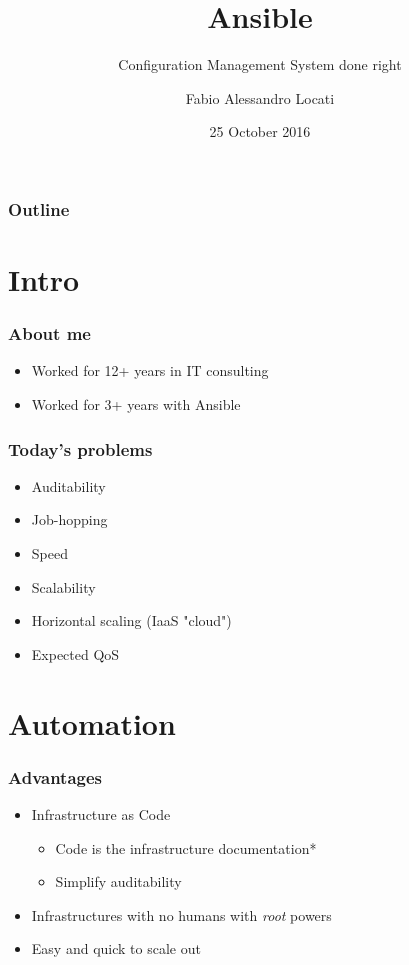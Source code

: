 \documentclass[t,aspectratio=169]{beamer}
\title{Ansible}
\subtitle{Configuration Management System done right}
\author{Fabio Alessandro Locati}
\date{25 October 2016}
\begin{document}
\maketitle

\begin{frame}
    \frametitle{Outline}
    \tableofcontents
\end{frame}

\section{Intro}
\begin{frame}
    \frametitle{About me}
    \begin{itemize}
        \item<2-> Worked for 12+ years in IT consulting
        \item<3-> Worked for 3+ years with Ansible 
    \end{itemize}
\end{frame}

\begin{frame}
    \frametitle{Today's problems}
    \begin{itemize}
        \item<2-> Auditability
        \item<3-> Job-hopping
        \item<4-> Speed
        \item<5-> Scalability
        \item<6-> Horizontal scaling (IaaS "cloud")
        \item<7-> Expected QoS
    \end{itemize}
\end{frame}

\section{Automation}

\begin{frame}
    \frametitle{Advantages}
    \begin{itemize}
        \item<2-> Infrastructure as Code
        \begin{itemize}
            \item<3-> Code is the infrastructure documentation*
            \item<4-> Simplify auditability
        \end{itemize}
        \item<5-> Infrastructures with no humans with \textit{root} powers
        \item<6-> Easy and quick to scale out
    \end{itemize}
\end{frame}
\end{document}
